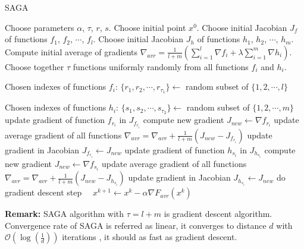 \documentclass[11pt]{book}
\begin{document}
\begin{algorithm}[H]
	\caption{SAGA \cite{SAGA}}
	\label{alg:saga}
	\begin{algorithmic}[1]
		\State Choose parameters $\alpha$, $\tau$, $r$, $s$.
		\State Choose initial point $x^0$.
		\State Choose initial Jacobian $J_f$ of functions $f_1$, $f_2$, $\cdots$, $f_l$.
		\State Choose initial Jacobian $J_h$ of functions $h_1$, $h_2$, $\cdots$, $h_m$.
		\State Compute initial average of gradients $\nabla_{avr} = \frac{1}{l+m} \left( \sum_{i=1}^l \nabla f_i + \lambda\sum_{i=1}^m \nabla h_i \right)$.
		\State Choose together $\tau$ functions uniformly randomly from all functions $f_i$ and $h_i$.
		
		Chosen indexes of functions $f_i$: $\{r_1, r_2, \cdots, r_{\tau_1} \} \leftarrow$ random subset of $\{1,2,\cdots, l \}$
		
		Chosen indexes of functions $h_i$: $\{s_1, s_2, \cdots, s_{\tau_2} \} \leftarrow$ random subset of $\{1,2,\cdots, m \}$
		 update gradient of function $f_{r_i}$ in $J_{f_{r_i}}$
		\State compute new gradient $J_{new} \leftarrow \nabla f_{r_i}$
		\State update average gradient of all functions $\nabla_{avr}=\nabla_{avr}+\frac{1}{l+m}(J_{new}-J_{f_{r_i}})$
		\State update gradient in Jacobian
		$J_{f_{r_i}} \leftarrow J_{new}$
		\EndFor
		 update gradient of function $h_{s_i}$ in $J_{h_{s_i}}$
		\State compute new gradient $J_{new} \leftarrow \nabla f_{s_i}$
		\State update average gradient of all functions $\nabla_{avr}=\nabla_{avr}+\frac{1}{l+m}(J_{new}-J_{h_{s_i}})$
		\State update gradient in Jacobian
		$J_{h_{s_i}} \leftarrow J_{new}$
		\EndFor
		\State do gradient descent step $\quad x^{k+1} \leftarrow x^k - \alpha\nabla F_{avr}(x^k) \quad$
		\EndFor
	\end{algorithmic}
\end{algorithm}

\textbf{Remark:} SAGA algorithm with $\tau=l+m$ is gradient descent algorithm.\\

Convergence rate of SAGA is referred as linear, it converges to distance $d$ with $\mathcal{O}(\log(\frac{1}{d}))$ iterations \cite{SAGA}, it should as fast as gradient descent.\\
\end{document}
